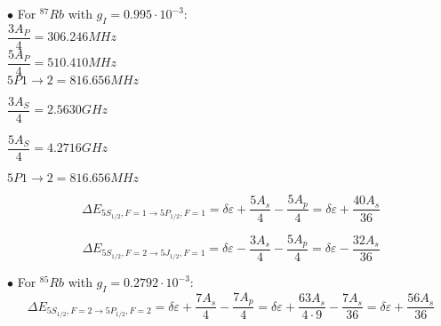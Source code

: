 \documentclass[openany,11pt,a4paper]{book}
\begin{document}
$\bullet$ For  $^{87}Rb$ with $g_{I}=0.995 \cdot 10^{-3}$:\\
         


$\dfrac{3A_{P}}{4}=306.246 MHz$\\


$\dfrac{5A_{P}}{4}=510.410 MHz$\\

$5P 1\rightarrow 2 = 816.656 MHz$


$\dfrac{3A_{S}}{4}= 2.5630 GHz$

$\dfrac{5A_{S}}{4}= 4.2716 GHz$


$5P 1\rightarrow 2 = 816.656 MHz$










\begin{equation*}
\Delta E_{5S_{1/2},F=1 \rightarrow 5P_{1/2}, F=1} = \delta\varepsilon  + \dfrac{5 A_{s}}{4} -\dfrac{5 A_{p}}{4}= \delta\varepsilon +  \dfrac{40 A_{s}}{36} 
\end{equation*}



\begin{equation*}
\Delta E_{ 5S_{1/2}, F=2 \rightarrow 5J_{1/2}, F=1} = \delta\varepsilon -\dfrac{3 A_{s}}{4} - \dfrac{5 A_{p}}{4}= \delta\varepsilon -\dfrac{32 A_{s}}{36}
\end{equation*}





$\bullet$ For  $^{85}Rb$ with $g_{I}=0.2792 \cdot 10^{-3}$:\\

\begin{equation*}
\Delta E_{5S_{1/2},F=2 \rightarrow 5P_{1/2}, F=2} = \delta\varepsilon  + \dfrac{7 A_{s}}{4} -\dfrac{7 A_{p}}{4}= \delta\varepsilon  + \dfrac{63 A_{s}}{4 \cdot 9} -\dfrac{7 A_{s}}{36} =  \delta\varepsilon +\dfrac{56 A_{s}}{36} 
\end{equation*}
\end{document}

